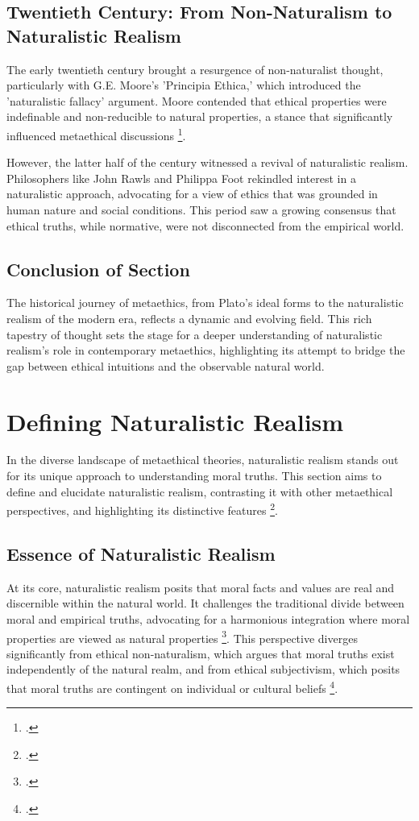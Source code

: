 \documentclass[12pt,a4paper]{article}
\begin{document}
\subsection{Twentieth Century: From Non-Naturalism to Naturalistic Realism}
The early twentieth century brought a resurgence of non-naturalist thought, particularly with G.E. Moore’s 'Principia Ethica,' which introduced the 'naturalistic fallacy' argument. Moore contended that ethical properties were indefinable and non-reducible to natural properties, a stance that significantly influenced metaethical discussions \footcite{Baldwin2006}. 

However, the latter half of the century witnessed a revival of naturalistic realism. Philosophers like John Rawls and Philippa Foot rekindled interest in a naturalistic approach, advocating for a view of ethics that was grounded in human nature and social conditions. This period saw a growing consensus that ethical truths, while normative, were not disconnected from the empirical world.

\subsection{Conclusion of Section}
The historical journey of metaethics, from Plato's ideal forms to the naturalistic realism of the modern era, reflects a dynamic and evolving field. This rich tapestry of thought sets the stage for a deeper understanding of naturalistic realism's role in contemporary metaethics, highlighting its attempt to bridge the gap between ethical intuitions and the observable natural world.

\section{Defining Naturalistic Realism}

In the diverse landscape of metaethical theories, naturalistic realism stands out for its unique approach to understanding moral truths. This section aims to define and elucidate naturalistic realism, contrasting it with other metaethical perspectives, and highlighting its distinctive features \footcite{Copp1991}.

\subsection{Essence of Naturalistic Realism}
At its core, naturalistic realism posits that moral facts and values are real and discernible within the natural world. It challenges the traditional divide between moral and empirical truths, advocating for a harmonious integration where moral properties are viewed as natural properties \footcite{Dreier2018}. This perspective diverges significantly from ethical non-naturalism, which argues that moral truths exist independently of the natural realm, and from ethical subjectivism, which posits that moral truths are contingent on individual or cultural beliefs \footcite{Joyce2014}.
\end{document}
